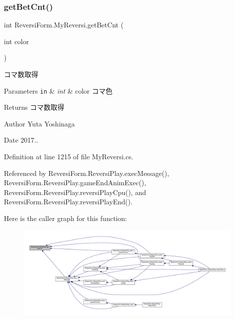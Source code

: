 \mbox{\label{class_reversi_form_1_1_my_reversi_aa69640136727deb89addafae8e8e54cb}} 
\subsubsection{\texorpdfstring{get\+Bet\+Cnt()}{getBetCnt()}}
{\footnotesize\ttfamily int Reversi\+Form.\+My\+Reversi.\+get\+Bet\+Cnt (\begin{DoxyParamCaption}\item[{int}]{color }\end{DoxyParamCaption})}



コマ数取得 


\begin{DoxyParams}[1]{Parameters}
\mbox{\tt in}  & {\em int} & color コマ色 \\
\hline
\end{DoxyParams}
\begin{DoxyReturn}{Returns}
コマ数取得 
\end{DoxyReturn}
\begin{DoxyAuthor}{Author}
Yuta Yoshinaga 
\end{DoxyAuthor}
\begin{DoxyDate}{Date}
2017.. 
\end{DoxyDate}


Definition at line 1215 of file My\+Reversi.\+cs.



Referenced by Reversi\+Form.\+Reversi\+Play.\+exec\+Message(), Reversi\+Form.\+Reversi\+Play.\+game\+End\+Anim\+Exec(), Reversi\+Form.\+Reversi\+Play.\+reversi\+Play\+Cpu(), and Reversi\+Form.\+Reversi\+Play.\+reversi\+Play\+End().

Here is the caller graph for this function\+:
\nopagebreak
\begin{figure}[H]
\begin{center}
\leavevmode
\includegraphics[width=350pt]{class_reversi_form_1_1_my_reversi_aa69640136727deb89addafae8e8e54cb_icgraph}
\end{center}
\end{figure}
\mbox{\label{class_reversi_form_1_1_my_reversi_a960e2691d2d106e5ad6036cfe9cf2503}} 
